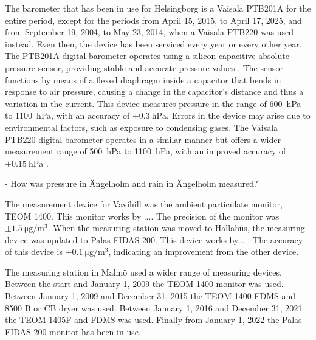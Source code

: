 The barometer that has been in use for Helsingborg is a Vaisala PTB201A for the entire period, except for the periods from April 15, 2015, to April 17, 2025, and from September 19, 2004, to May 23, 2014, when a Vaisala PTB220 was used instead. Even then, the device has been serviced every year or every other year. The PTB201A digital barometer operates using a silicon capacitive absolute pressure sensor, providing stable and accurate pressure values \cite{vaisalaPTB200DIGITAL1993}. The sensor functions by means of a flexed diaphragm inside a capacitor that bends in response to air pressure, causing a change in the capacitor’s distance and thus a variation in the current. This device measures pressure in the range of \SI{600}{\hecto\pascal} to \SI{1100}{\hecto\pascal}, with an accuracy of $\pm\SI{0.3}{\hecto\pascal}$. Errors in the device may arise due to environmental factors, such as exposure to condensing gases. The Vaisala PTB220 digital barometer operates in a similar manner but offers a wider measurement range of \SI{500}{\hecto\pascal} to \SI{1100}{\hecto\pascal}, with an improved accuracy of $\pm\SI{0.15}{\hecto\pascal}$ \cite{vaisalaPTB220SeriesDigital2001}.


- How was pressure in Ängelholm  and rain in Ängelholm measured? 

The measurement device for Vavihill was the ambient particulate monitor, TEOM 1400. This monitor works by ...\cite{thermofisherscientificinc.TEOMSeries1400a2007}. The precision of the monitor was $\pm\SI{1.5}{\micro\gram\per\meter\cubed}$. When the measuring station was moved to Hallahus, the measuring device was updated to Palas FIDAS 200. This device works by... \cite{palasgmbhOperatingManualFidas}. The accuracy of this device is $\pm\SI{0.1}{\micro\gram\per\meter\cubed}$, indicating an improvement from the other device. 

The measuring station in Malmö used a wider range of measuring devices. Between the start and January 1, 2009 the TEOM 1400 monitor was used. Between January 1, 2009 and December 31, 2015 the TEOM 1400 FDMS and 8500 B or CB dryer was used. Between January 1, 2016 and December 31, 2021 the TEOM 1405F and FDMS was used. Finally from January 1, 2022 the Palas FIDAS 200 monitor has been in use. 

